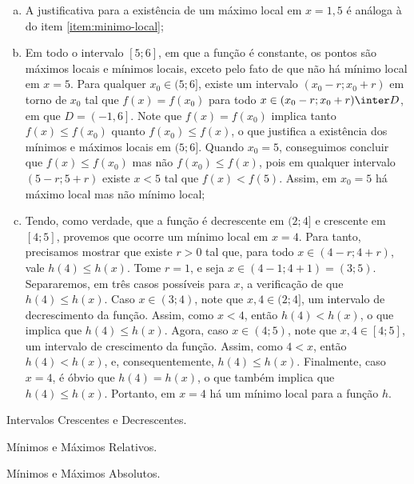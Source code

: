 \begin{solution}
\begin{enumerate}[(a)]
        No item \ref{item:minimo-local-formal}, é demonstrado que, de fato, há um mínimo local em $x=4$.
        \item A justificativa para a existência de um máximo local em $x=1{,}5$ é análoga à do item \ref{item:minimo-local};
        \item Em todo o intervalo $[5; 6]$, em que a função é constante, 
        os pontos são máximos locais e mínimos locais, exceto pelo fato de que não há mínimo local em $x=5$. 
        Para qualquer $x_0\in (5;6]$, existe um intervalo $(x_0 - r; x_0+r)$ em torno de $x_0$ tal que $f(x)= f(x_0)$ para todo $x \in (x_0 - r; x_0+r) \inter D$, em que $D = \left(-1,6\right]$.
        Note que $f(x)= f(x_0)$ implica tanto $f(x) \leq f(x_0)$ quanto $f(x_0)\leq f(x)$, 
        o que justifica a existência dos mínimos e máximos locais em $(5;6]$. 
        Quando $x_0=5$, conseguimos concluir que $f(x) \le f(x_0)$ mas não $f(x_0) \le f(x)$, 
        pois em qualquer intervalo $(5 - r; 5+r)$ existe $x < 5$ tal que $f(x) < f(5)$.
        Assim, em $x_0=5$ há máximo local mas não mínimo local;
        \item \label{item:minimo-local-formal} Tendo, como verdade, que a função é decrescente em $(2; 4]$ e crescente em $[4; 5]$, 
        provemos que ocorre um mínimo local em $x=4$. Para tanto, precisamos mostrar que existe $r>0$ tal que, 
        para todo $x \in (4-r; 4+r)$, vale $h(4) \leq h(x)$. 
        Tome $r=1$, e seja $x \in (4-1; 4+1) = (3; 5)$. 
        Separaremos, em três casos possíveis para $x$, a verificação de que $h(4) \leq h(x)$. 
        Caso $x \in (3; 4)$, note que $x, 4 \in (2; 4]$, um intervalo de decrescimento da função. 
        Assim, como $x<4$, então $h(4)< h(x)$, o que implica que $h(4) \leq h(x)$. 
        Agora, caso $x \in (4; 5)$, note que $x, 4 \in [4; 5]$, um intervalo de crescimento da função. 
        Assim, como $4<x$, então $h(4)< h(x)$, e, consequentemente, $h(4)\le h(x)$.
        Finalmente, caso $x=4$, é óbvio que $h(4)=h(x)$, o que também implica que $h(4)\le h(x)$. 
        Portanto, em $x=4$ há um mínimo local para a função $h$.
    \end{enumerate}
\end{solution}

\begin{onlineact}
    {Intervalos Crescentes e Decrescentes}.
\end{onlineact}

\begin{onlineact}
    {Mínimos e Máximos Relativos}.
\end{onlineact}

\begin{onlineact}
    {Mínimos e Máximos Absolutos}.
\end{onlineact}